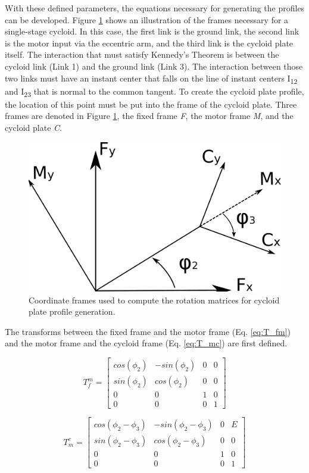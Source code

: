 With these defined parameters, the equations necessary for generating the profiles can be developed.
Figure \ref{fig:single_frames} shows an illustration of the frames necessary for a single-stage cycloid. In this case, the first link is the ground link, the second link is the motor input via the eccentric arm, and the third link is the cycloid plate itself. The interaction that must satisfy Kennedy's Theorem is between the cycloid link (Link 1) and the ground link (Link 3). The interaction between those two links must have an instant center that falls on the line of instant centers I\textsubscript{12} and I\textsubscript{23} that is normal to the common tangent. To create the cycloid plate profile, the location of this point must be put into the frame of the cycloid plate. Three frames are denoted in Figure \ref{fig:single_frames}, the fixed frame \textit{F}, the motor frame \textit{M}, and the cycloid plate \textit{C}. 

\begin{figure}[!b]
   \centering
   \includegraphics[width=0.50\linewidth]{fig/single_stage_frames}
   \caption{Coordinate frames used to compute the rotation matrices for cycloid plate profile generation.}
   \label{fig:single_frames}
\end{figure}

The transforms between the fixed frame and the motor frame (Eq. \ref{eq:T_fm}) and the motor frame and the cycloid frame (Eq. \ref{eq:T_mc}) are first defined. 

\begin{equation} \label{eq:T_fm}
T_f^m = \left[{\begin{array}{cccc}
		cos(\phi_2) & -sin(\phi_2) & 0 & 0\\
		sin(\phi_2) & cos(\phi_2) & 0 & 0\\
		0 & 0 & 1 & 0\\
		0 & 0 & 0 & 1 \end{array} } \right]
\end{equation}

\begin{equation} \label{eq:T_mc}
T_m^c = \left[{\begin{array}{cccc}
		cos(\phi_2 - \phi_3) & -sin(\phi_2 - \phi_3) & 0 & E\\
		sin(\phi_2 - \phi_3) & cos(\phi_2 - \phi_3) & 0 & 0\\
		0 & 0 & 1 & 0\\
		0 & 0 & 0 & 1 \end{array} } \right]
\end{equation}

